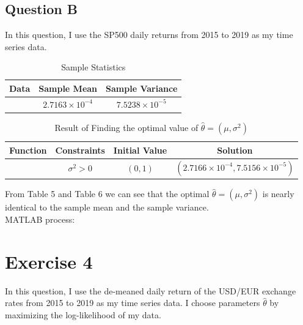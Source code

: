 \documentclass{report}
\begin{document}
\subsection*{Question B}
In this question, I use the SP500 daily returns from 2015 to 2019 as my time series data.


\begin{table}[H]
	\begin{center}
		\caption{Sample Statistics}
		\label{tab:table5}
		\vspace{2mm}
		\begin{tabular}{c|c|c} 
			
			\textbf{Data}&\textbf{Sample Mean} & \textbf{Sample Variance}\\
			\hline
			
			\text{SP500 Daily Return} &  $2.7163\times 10^{-4}$ & 	$7.5238\times 10^{-5}$
		\end{tabular}
	\end{center}
\end{table}

\begin{table}[H]
	\begin{center}
		\caption{Result of Finding the optimal value of $\hat{\theta}=(\mu, \sigma^2)$}
		\label{tab:table6}
		\vspace{2mm}
		\begin{tabular}{c|c|c|c} 
			
			\textbf{Function} & \textbf{Constraints}& \textbf{Initial Value}& \textbf{Solution} \\
			\hline
			
			\text{fmincon} &$\sigma^2 > 0$ & $(0,1)$ & 	$(2.7166\times 10^{-4}, 7.5156\times 10^{-5})$ 
		\end{tabular}
	\end{center}
\end{table}


From Table 5 and Table 6 we can see that the optimal $\hat{\theta}=(\mu, \sigma^2)$ is nearly identical to the sample mean and the sample variance.\\

MATLAB process:







\section*{Exercise 4}
In this question, I use the de-meaned daily return of the USD/EUR exchange rates from 2015 to 2019 as my time series data. I choose parameters $\hat{\theta}$ by maximizing the log-likelihood of my data. \\
\end{document}
